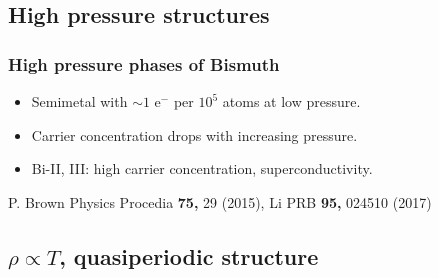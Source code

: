 
\subsection{High pressure structures}
\begin{frame}[label=BiRes]
\frametitle{High pressure phases of Bismuth}
\centerline{}

\begin{itemize}
\item <visible@1-> Semimetal with $\sim 1$ e$^-$ per $10^5$ atoms at
  low pressure.

\item <visible@2-> Carrier concentration drops with increasing pressure.

\item <visible@6-> Bi-II, III: high carrier concentration, superconductivity.

\end{itemize}

\vspace*{\fill}
\centerline{\makebox[\linewidth]{\rule{0.85\textwidth}{0.4pt}}}
\centerline{\scriptsize P. Brown Physics Procedia {\bf 75,} 29 (2015), Li PRB {\bf 95,} 024510  (2017)}
\end{frame}

\subsection{$\rho \propto T$, quasiperiodic structure}

